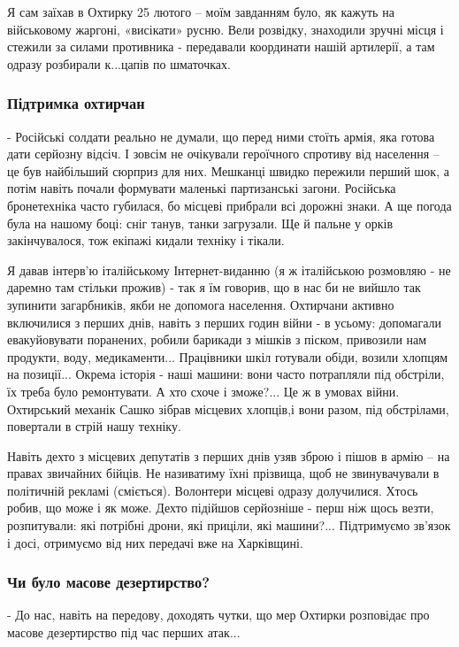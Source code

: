 Я сам заїхав в Охтирку 25 лютого – моїм завданням було, як кажуть на
військовому жаргоні, «висікати» русню. Вели розвідку, знаходили зручні місця і
стежили за силами противника - передавали координати нашій артилерії, а там
одразу розбирали к...цапів по шматочках.

\subsubsection{Підтримка охтирчан}

- Російські солдати реально не думали, що перед ними стоїть армія, яка готова
дати серйозну відсіч. І зовсім не очікували героїчного спротиву від населення –
це був найбільший сюрприз для них. Мешканці швидко пережили перший шок, а потім
навіть почали формувати маленькі партизанські загони. Російська бронетехніка
часто губилася, бо місцеві прибрали всі дорожні знаки. А ще погода була на
нашому боці: сніг танув, танки загрузали. Ще й пальне у орків закінчувалося,
тож екіпажі кидали техніку і тікали.

Я давав інтерв'ю італійському Інтернет-виданню (я ж італійською розмовляю - не
даремно там стільки прожив) - так я їм говорив, що в нас би не вийшло так
зупинити загарбників, якби не допомога населення. Охтирчани активно включилися
з перших днів, навіть з перших годин війни - в усьому: допомагали евакуйовувати
поранених, робили барикади з мішків з піском, привозили нам продукти, воду,
медикаменти... Працівники шкіл готували обіди, возили хлопцям на позиції...
Окрема історія - наші машини: вони часто потрапляли під обстріли, їх треба було
ремонтувати. А хто схоче і зможе?... Це ж в умовах війни. Охтирський механік
Сашко зібрав місцевих хлопців,і вони разом, під обстрілами, повертали в стрій
нашу техніку.

Навіть дехто з місцевих депутатів з перших днів узяв зброю і пішов в армію – на
правах звичайних бійців. Не називатиму їхні прізвища, щоб не звинувачували в
політичній рекламі (сміється). Волонтери місцеві одразу долучилися. Хтось
робив, що може і як може. Дехто підійшов серйозніше - перш ніж щось везти,
розпитували: які потрібні дрони, які приціли, які машини?... Підтримуємо
зв'язок і досі, отримуємо від них передачі вже на Харківщині.

\subsubsection{Чи було масове дезертирство?}

- До нас, навіть на передову, доходять чутки, що мер Охтирки розповідає про
масове дезертирство під час перших атак...

